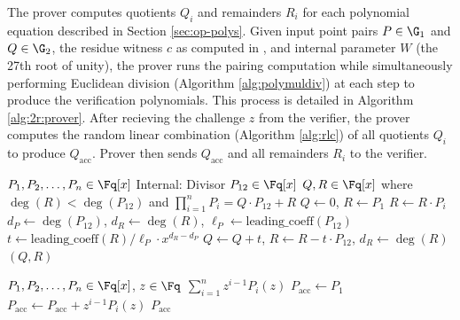 The prover computes quotients $Q_i$ and remainders $R_i$ for each polynomial equation described in Section \ref{sec:op-polys}. Given input point pairs $P \in \G_1$ and $Q \in \G_2$, the residue witness $c$ as computed in \cite{OPP24}, and internal parameter $W$ (the 27th root of unity), the prover runs the pairing computation while simultaneously performing Euclidean division (Algorithm \ref{alg:polymuldiv}) at each step to produce the verification polynomials. This process is detailed in Algorithm \ref{alg:2r:prover}. After recieving the challenge $z$ from the verifier, the prover computes the random linear combination (Algorithm \ref{alg:rlc}) of all quotients $Q_i$ to produce $Q_\text{acc}$. Prover then sends $Q_\text{acc}$ and all remainders $R_i$ to the verifier.

\begin{algorithm}
\caption{PolyMulDiv: Polynomial multiplication and Euclidean division}
\label{alg:polymuldiv}
\begin{algorithmic}[1]
\Require $P_1, P_2, \ldots, P_n \in \Fq[x]$
\Statex Internal: Divisor $P_{12} \in \Fq[x]$
\Ensure $Q, R \in \Fq[x]$ where $\deg(R) < \deg(P_{12})$ and $\prod_{i=1}^{n} P_i = Q \cdot P_{12} + R$
\State $Q \leftarrow 0$, $R \leftarrow P_1$ 
 
    \State $R \leftarrow R \cdot P_i$ 
\EndFor
\State $d_P \leftarrow \deg(P_{12})$, $d_R \leftarrow \deg(R)$, $\ell_P \leftarrow \text{leading\_coeff}(P_{12})$
 
\State $t \leftarrow \text{leading\_coeff}(R)/\ell_P \cdot x^{d_R - d_{P}}$
\State $Q \leftarrow Q + t$, $R \leftarrow R - t \cdot P_{12}$, $d_R \leftarrow \deg(R)$
\EndWhile
\State \Return $(Q, R)$ 
\end{algorithmic}
\end{algorithm}
\begin{algorithm}
\caption{Random Linear Combination: Adjacent Powers}
\label{alg:rlc}
\begin{algorithmic}[1]
\Require $P_1, P_2, \ldots, P_n \in \Fq[x]$, $z \in \Fq$
\Ensure $\sum_{i=1}^{n} z^{i-1} P_i(z)$
\State $P_\text{acc} \leftarrow P_1$ 
 
    \State $P_\text{acc} \leftarrow P_\text{acc} + z^{i-1} P_i(z)$
\EndFor
\State \Return $P_\text{acc}$
\end{algorithmic}
\end{algorithm}

